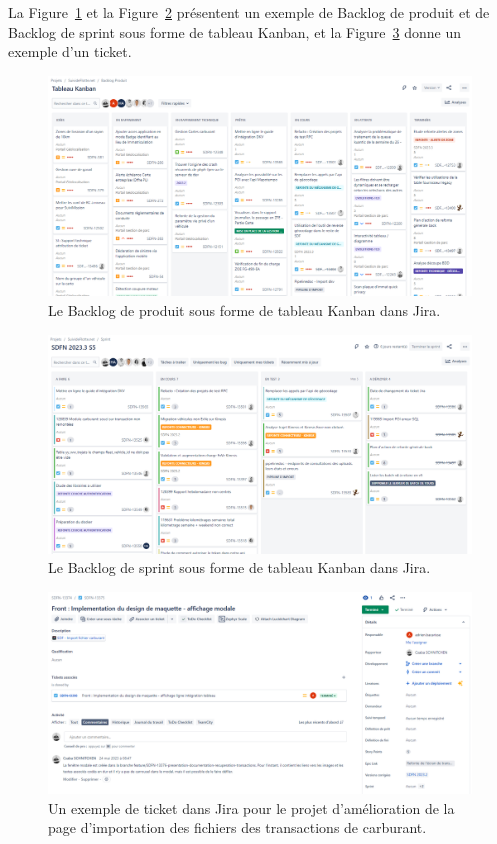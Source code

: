 La Figure~\ref{fig:product-backlog} et la Figure~\ref{fig:sprint} présentent un exemple de Backlog de produit et de Backlog de sprint sous forme de tableau Kanban, et la Figure~\ref{fig:ticket} donne un exemple d'un ticket.

\begin{figure}[h]
    \centering
    \includegraphics[width=\textwidth]{img/product-backlog}
    \caption{Le Backlog de produit sous forme de tableau Kanban dans Jira.}
    \label{fig:product-backlog}
\end{figure}

\begin{figure}[h]
    \centering
    \includegraphics[width=\textwidth]{img/sprint}
    \caption{Le Backlog de sprint sous forme de tableau Kanban dans Jira.}
    \label{fig:sprint}
\end{figure}

\begin{figure}[h]
    \centering
    \includegraphics[width=\textwidth]{img/ticket}
    \caption{Un exemple de ticket dans Jira pour le projet d'amélioration de la page d'importation des fichiers des transactions de carburant.}
    \label{fig:ticket}
\end{figure}